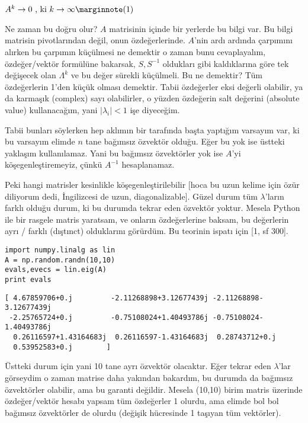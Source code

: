 \documentclass[12pt,fleqn]{article}\usepackage{../../common}
\begin{document}
$
A^k \to 0 \textrm{ , ki } k \to \infty  
\mlabel{1}
$ 

Ne zaman bu doğru olur? $A$ matrisinin içinde bir yerlerde bu bilgi var. Bu
bilgi matrisin pivotlarından değil, onun özdeğerlerinde. $A$'nin ardı
ardında çarpımını alırken bu çarpımın küçülmesi ne demektir o zaman bunu
cevaplayalım, özdeğer/vektör formülüne bakarsak, $S,S^{-1}$ oldukları gibi
kaldıklarına göre tek değişecek olan $\Lambda^k$ ve bu değer sürekli
küçülmeli. Bu ne demektir? Tüm özdeğerlerin 1'den küçük olması
demektir. Tabii özdeğerler eksi değerli olabilir, ya da karmaşık (complex)
sayı olabilirler, o yüzden özdeğerin salt değerini (absolute value)
kullanacağım, yani $|\lambda_i| < 1$ işe diyeceğim. 

Tabii bunları söylerken hep aklımın bir tarafında başta yaptığım varsayım
var, ki bu varsayım elimde $n$ tane bağımsız özvektör olduğu. Eğer bu yok
ise üstteki yaklaşım kullanılamaz. Yani bu bağımsız özvektörler yok ise
$A$'yi köşegenleştiremeyiz, çünkü $A^{-1}$ hesaplanamaz.

Peki hangi matrisler kesinlikle köşegenleştirilebilir [hoca bu uzun kelime
için özür diliyorum dedi, İngilizcesi de uzun, diagonalizable]. Güzel durum
tüm $\lambda$'ların farklı olduğu durum, ki bu durumda tekrar eden özvektör
yoktur. Mesela Python ile bir rasgele matris yaratsam, ve onların
özdeğerlerine baksam, bu değerlerin ayrı / farklı (dıştınct) olduklarını
görürdüm. Bu teorinin ispatı için [1, sf 300]. 

\begin{verbatim}
import numpy.linalg as lin
A = np.random.randn(10,10)
evals,evecs = lin.eig(A)
print evals
\end{verbatim}

\begin{verbatim}
[ 4.67859706+0.j         -2.11268898+3.12677439j -2.11268898-3.12677439j
 -2.25765724+0.j         -0.75108024+1.40493786j -0.75108024-1.40493786j
  0.26116597+1.43164683j  0.26116597-1.43164683j  0.28743712+0.j
  0.53952583+0.j        ]
\end{verbatim}

Üstteki durum için yani 10 tane ayrı özvektör olacaktır. Eğer tekrar eden
$\lambda$'lar görseydim o zaman matrise daha yakından bakardım, bu durumda
da bağımsız özvektörler olabilir, ama bu garanti değildir. Mesela (10,10)
birim matris üzerinde özdeğer/vektör hesabı yapsam tüm özdeğerler 1 olurdu,
ama elimde bol bol bağımsız özvektörler de olurdu (değişik hücresinde 1
taşıyan tüm vektörler).
\end{document}
